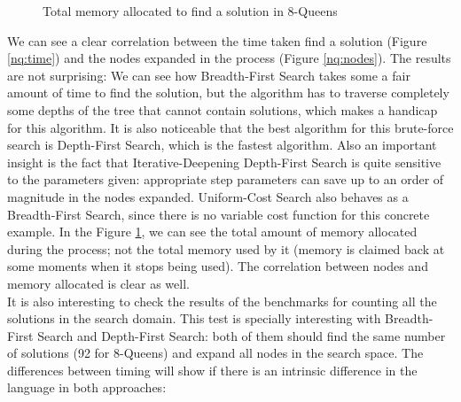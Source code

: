 \begin{figure}[!htbp]
  \centering
  \caption{Total memory allocated to find a solution in 8-Queens}
  \label{nq:memory}
\end{figure}


We can see a clear correlation between the time taken find a solution (Figure
\ref{nq:time}) and the nodes expanded in the process (Figure \ref{nq:nodes}).
The results are not surprising: We can see how Breadth-First Search takes some
a fair amount of time to find the solution, but the algorithm has to traverse
completely some depths of the tree that cannot contain solutions, which makes
a handicap for this algorithm. It is also noticeable that the best algorithm
for this brute-force search is Depth-First Search, which is the fastest
algorithm. Also an important insight is the fact that Iterative-Deepening
Depth-First Search is quite sensitive to the parameters given: appropriate step
parameters can save up to an order of magnitude in the nodes expanded.
Uniform-Cost Search also behaves as a Breadth-First Search, since there is no
variable cost function for this concrete example. In the Figure
\ref{nq:memory}, we can see the total amount of memory allocated during the
process; not the total memory used by it (memory is claimed back at some
moments when it stops being used). The correlation between nodes and memory
allocated is clear as well.\\

It is also interesting to check the results of the benchmarks for counting all
the solutions in the search domain. This test is specially interesting with
Breadth-First Search and Depth-First Search: both of them should find the same
number of solutions (92 for 8-Queens) and expand all nodes in the search space.
The differences between timing will show if there is an intrinsic difference in
the language in both approaches:\\

